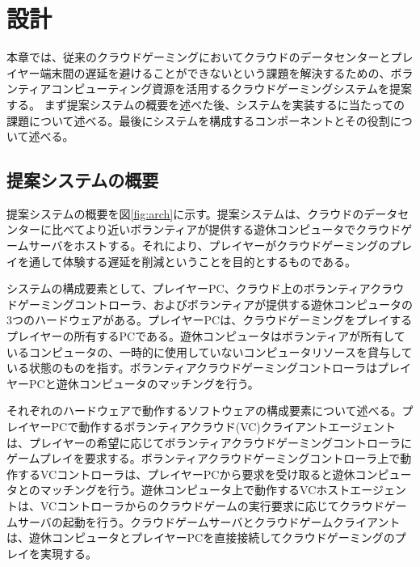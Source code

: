 \section{設計}

本章では、従来のクラウドゲーミングにおいてクラウドのデータセンターとプレイヤー端末間の遅延を避けることができないという課題を解決するための、ボランティアコンピューティング資源を活用するクラウドゲーミングシステムを提案する。
まず提案システムの概要を述べた後、システムを実装するに当たっての課題について述べる。最後にシステムを構成するコンポーネントとその役割について述べる。

\subsection{提案システムの概要}
提案システムの概要を図\ref{fig:arch}に示す。提案システムは、クラウドのデータセンターに比べてより近いボランティアが提供する遊休コンピュータでクラウドゲームサーバをホストする。それにより、プレイヤーがクラウドゲーミングのプレイを通して体験する遅延を削減ということを目的とするものである。

システムの構成要素として、プレイヤーPC、クラウド上のボランティアクラウドゲーミングコントローラ、およびボランティアが提供する遊休コンピュータの3つのハードウェアがある。プレイヤーPCは、クラウドゲーミングをプレイするプレイヤーの所有するPCである。遊休コンピュータはボランティアが所有しているコンピュータの、一時的に使用していないコンピュータリソースを貸与している状態のものを指す。ボランティアクラウドゲーミングコントローラはプレイヤーPCと遊休コンピュータのマッチングを行う。

それぞれのハードウェアで動作するソフトウェアの構成要素について述べる。プレイヤーPCで動作するボランティアクラウド(VC)クライアントエージェントは、プレイヤーの希望に応じてボランティアクラウドゲーミングコントローラにゲームプレイを要求する。ボランティアクラウドゲーミングコントローラ上で動作するVCコントローラは、プレイヤーPCから要求を受け取ると遊休コンピュータとのマッチングを行う。遊休コンピュータ上で動作するVCホストエージェントは、VCコントローラからのクラウドゲームの実行要求に応じてクラウドゲームサーバの起動を行う。クラウドゲームサーバとクラウドゲームクライアントは、遊休コンピュータとプレイヤーPCを直接接続してクラウドゲーミングのプレイを実現する。

%


